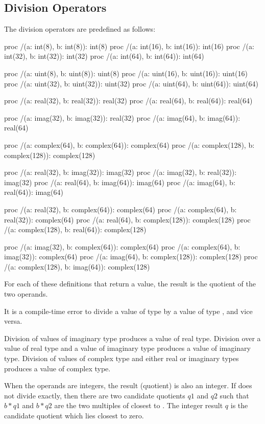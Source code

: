 \pagebreak
\subsection{Division Operators}
\label{Division_Operators}

The division operators are predefined as follows:
\begin{chapel}
proc /(a: int(8), b: int(8)): int(8)
proc /(a: int(16), b: int(16)): int(16)
proc /(a: int(32), b: int(32)): int(32)
proc /(a: int(64), b: int(64)): int(64)

proc /(a: uint(8), b: uint(8)): uint(8)
proc /(a: uint(16), b: uint(16)): uint(16)
proc /(a: uint(32), b: uint(32)): uint(32)
proc /(a: uint(64), b: uint(64)): uint(64)

proc /(a: real(32), b: real(32)): real(32)
proc /(a: real(64), b: real(64)): real(64)

proc /(a: imag(32), b: imag(32)): real(32)
proc /(a: imag(64), b: imag(64)): real(64)

proc /(a: complex(64), b: complex(64)): complex(64)
proc /(a: complex(128), b: complex(128)): complex(128)

proc /(a: real(32), b: imag(32)): imag(32)
proc /(a: imag(32), b: real(32)): imag(32)
proc /(a: real(64), b: imag(64)): imag(64)
proc /(a: imag(64), b: real(64)): imag(64)

proc /(a: real(32), b: complex(64)): complex(64)
proc /(a: complex(64), b: real(32)): complex(64)
proc /(a: real(64), b: complex(128)): complex(128)
proc /(a: complex(128), b: real(64)): complex(128)

proc /(a: imag(32), b: complex(64)): complex(64)
proc /(a: complex(64), b: imag(32)): complex(64)
proc /(a: imag(64), b: complex(128)): complex(128)
proc /(a: complex(128), b: imag(64)): complex(128)
\end{chapel}
For each of these definitions that return a value, the result is the
quotient of the two operands.

It is a compile-time error to divide a value of type  by
a value of type , and vice versa.

Division of values of imaginary type produces a value of real type.
Division over a value of real type and a value of imaginary type
produces a value of imaginary type.  Division of values of complex
type and either real or imaginary types produces a value of complex
type.

When the operands are integers, the result (quotient) is also an integer.  If 
does not divide  exactly, then there are two candidate quotients $q1$ and $q2$
such that $b * q1$ and $b * q2$ are the two multiples of  closest to .
The integer result $q$ is the candidate quotient which lies closest to zero.

